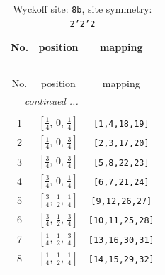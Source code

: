 \documentclass[fleqn,8pt]{jsarticle}
\begin{document}
\begin{longtable}{ccc}
\caption{Wyckoff site: {\tt 8b}, site symmetry: {\tt 2'2'2}}
 \\
 \hline \hline
No. & position & mapping \\ \hline \endfirsthead

\multicolumn{2}{l}{\tablename\ \thetable{}} \\
 \hline \hline
No. & position & mapping \\ \hline \endhead

 \hline \hline
\multicolumn{2}{r}{\footnotesize\it continued ...} \\ \endfoot

 \hline \hline
\multicolumn{2}{r}{} \\ \endlastfoot

1 & $\left[ \frac{1}{4},\, 0,\, \frac{1}{4} \right]$ & {\tt [1,4,18,19]} \\ \hline
2 & $\left[ \frac{1}{4},\, 0,\, \frac{3}{4} \right]$ & {\tt [2,3,17,20]} \\ \hline
3 & $\left[ \frac{3}{4},\, 0,\, \frac{3}{4} \right]$ & {\tt [5,8,22,23]} \\ \hline
4 & $\left[ \frac{3}{4},\, 0,\, \frac{1}{4} \right]$ & {\tt [6,7,21,24]} \\ \hline
5 & $\left[ \frac{3}{4},\, \frac{1}{2},\, \frac{1}{4} \right]$ & {\tt [9,12,26,27]} \\ \hline
6 & $\left[ \frac{3}{4},\, \frac{1}{2},\, \frac{3}{4} \right]$ & {\tt [10,11,25,28]} \\ \hline
7 & $\left[ \frac{1}{4},\, \frac{1}{2},\, \frac{3}{4} \right]$ & {\tt [13,16,30,31]} \\ \hline
8 & $\left[ \frac{1}{4},\, \frac{1}{2},\, \frac{1}{4} \right]$ & {\tt [14,15,29,32]} \\
\end{longtable}
\renewcommand{\arraystretch}{1.2}
\end{document}
